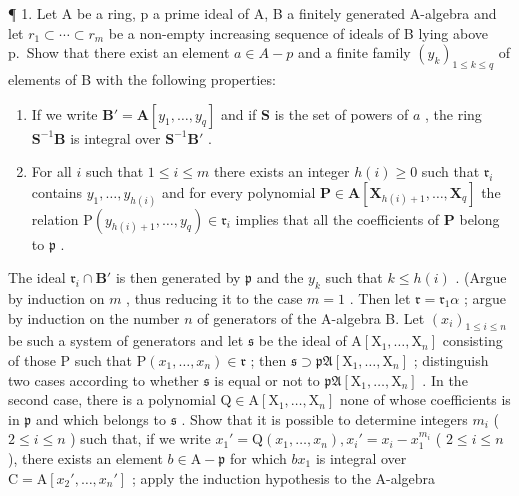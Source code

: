 
¶ 1. Let A be a ring, p a prime ideal of A, B a finitely generated A-algebra and let \(r_{1} \subset \cdots \subset r_{m}\) be a non-empty increasing sequence of ideals of B lying above p.~Show that there exist an element \(a \in A - p\) and a finite family \((y_{k})_{1 \leqslant k \leqslant q}\) of elements of B with the following properties:

\begin{enumerate}
\def\labelenumi{(\arabic{enumi})}
\item
  If we write \(\mathbf{B}' = \mathbf{A}[y_1, \ldots, y_q]\) and if \(\mathbf{S}\) is the set of powers of \(a\) , the ring \(\mathbf{S}^{-1}\mathbf{B}\) is integral over \(\mathbf{S}^{-1}\mathbf{B}'\) .
\item
  For all \(i\) such that \(1 \leqslant i \leqslant m\) there exists an integer \(h(i) \geqslant 0\) such that \(\mathfrak{r}_i\) contains \(y_1, \ldots, y_{h(i)}\) and for every polynomial \(\mathbf{P} \in \mathbf{A}[\mathbf{X}_{h(i)+1}, \ldots, \mathbf{X}_q]\) the relation \(\mathrm{P}(y_{h(i)+1}, \ldots, y_q) \in \mathfrak{r}_i\) implies that all the coefficients of \(\mathbf{P}\) belong to \(\mathfrak{p}\) .
\end{enumerate}

The ideal \(\mathfrak{r}_i\cap \mathbf{B}'\) is then generated by \(\mathfrak{p}\) and the \(y_{k}\) such that \(k\leqslant h(i)\) . (Argue by induction on \(m\) , thus reducing it to the case \(m = 1\) . Then let \(\mathfrak{r} = \mathfrak{r}_1\alpha\) ; argue by induction on the number \(n\) of generators of the A-algebra B. Let \((x_{i})_{1\leqslant i\leqslant n}\) be such a system of generators and let \(\mathfrak{s}\) be the ideal of \(\mathrm{A}[\mathrm{X}_1,\dots ,\mathrm{X}_n]\) consisting of those P such that \(\mathrm{P}(x_1,\ldots ,x_n)\in \mathfrak{r}\) ; then \(\mathfrak{s}\supset \mathfrak{pA}[\mathrm{X}_1,\ldots ,\mathrm{X}_n]\) ; distinguish two cases according to whether \(\mathfrak{s}\) is equal or not to \(\mathfrak{pA}[\mathrm{X}_1,\ldots ,\mathrm{X}_n]\) . In the second case, there is a polynomial \(\mathrm{Q}\in \mathrm{A}[\mathrm{X}_1,\ldots ,\mathrm{X}_n]\) none of whose coefficients is in \(\mathfrak{p}\) and which belongs to \(\mathfrak{s}\) . Show that it is possible to determine integers \(m_i\) ( \(2\leqslant i\leqslant n\) ) such that, if we write \(x_1' = \mathrm{Q}(x_1,\ldots ,x_n),x_i' = x_i - x_1^{m_i}\) ( \(2\leqslant i\leqslant n\) ), there exists an element \(b\in \mathrm{A} - \mathfrak{p}\) for which \(bx_{1}\) is integral over \(\mathrm{C} = \mathrm{A}[x_2',\ldots ,x_n']\) ; apply the induction hypothesis to the A-algebra

